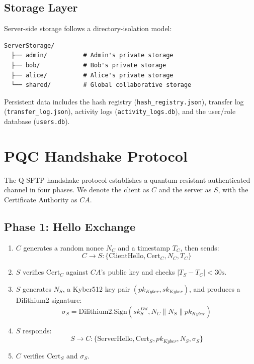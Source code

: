 \documentclass[12pt, a4paper]{article}
\begin{document}
\subsection{Storage Layer}

Server-side storage follows a directory-isolation model:

\begin{lstlisting}[language={}, caption={Server storage directory structure}, label={lst:storage}]
ServerStorage/
  ├── admin/          # Admin's private storage
  ├── bob/            # Bob's private storage
  ├── alice/          # Alice's private storage
  └── shared/         # Global collaborative storage
\end{lstlisting}

Persistent data includes the hash registry (\texttt{hash\_registry.json}), transfer log (\texttt{transfer\_log.json}), activity logs (\texttt{activity\_logs.db}), and the user/role database (\texttt{users.db}).

\section{PQC Handshake Protocol}
\label{sec:handshake}

The Q-SFTP handshake protocol establishes a quantum-resistant authenticated channel in four phases. We denote the client as $C$ and the server as $S$, with the Certificate Authority as $CA$.

\subsection{Phase 1: Hello Exchange}

\begin{enumerate}[label=\arabic*., itemsep=2pt]
    \item $C$ generates a random nonce $N_C$ and a timestamp $T_C$, then sends:
    \[
    C \rightarrow S : \{\text{ClientHello}, \text{Cert}_C, N_C, T_C\}
    \]
    \item $S$ verifies $\text{Cert}_C$ against $CA$'s public key and checks $|T_S - T_C| < 30\text{s}$.
    \item $S$ generates $N_S$, a Kyber512 key pair $(pk_{Kyber}, sk_{Kyber})$, and produces a Dilithium2 signature:
    \[
    \sigma_S = \text{Dilithium2.Sign}(sk_S^{Dil}, N_C \| N_S \| pk_{Kyber})
    \]
    \item $S$ responds:
    \[
    S \rightarrow C : \{\text{ServerHello}, \text{Cert}_S, pk_{Kyber}, N_S, \sigma_S\}
    \]
    \item $C$ verifies $\text{Cert}_S$ and $\sigma_S$.
\end{enumerate}
\end{document}
